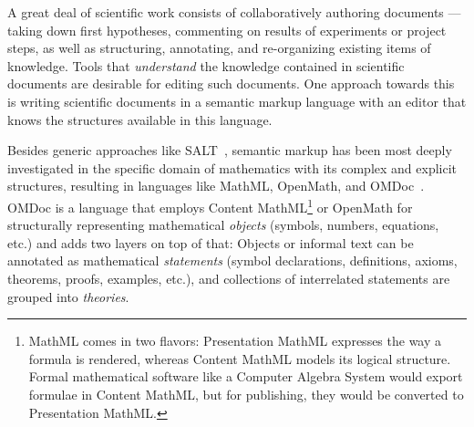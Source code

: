 \documentclass{llncs}
\begin{document}

A great deal of scientific work consists of collaboratively authoring documents --- taking
down first hypotheses, commenting on results of experiments or project steps, as well as
structuring, annotating, and re-organizing existing items of knowledge.  Tools
that \emph{understand} the knowledge contained in scientific documents are desirable for
editing such documents.  One approach towards this is writing scientific documents in a semantic
markup language with an editor that knows the structures available in this language.

Besides generic approaches like SALT~\cite{Groza:SALT07}, semantic markup has been most
deeply investigated in the specific domain of mathematics with its complex and explicit
structures, resulting in languages like MathML, OpenMath,  and
OMDoc~\cite{Kohlhase:omdoc1.2}.  OMDoc is a language that employs Content
MathML\footnote{MathML comes in two flavors: Presentation MathML expresses the way a
  formula is rendered, whereas Content MathML models its logical structure.  Formal
  mathematical software like a Computer Algebra System would export formulae in Content
  MathML, but for publishing, they would be converted to Presentation MathML.} or OpenMath
for structurally representing mathematical \emph{objects} (symbols, numbers, equations,
etc.) and adds two layers on top of that: Objects or informal text can be annotated as
mathematical \emph{statements} (symbol declarations, definitions, axioms, theorems,
proofs, examples, etc.), and collections of interrelated statements are grouped into
\emph{theories}.
\end{document}
